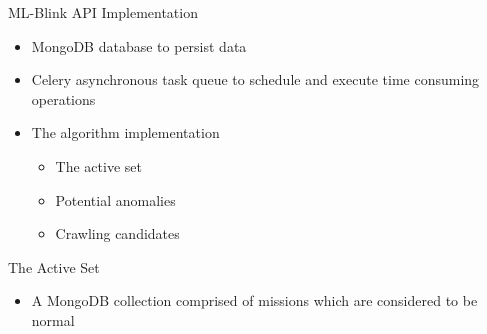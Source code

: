 \begin{frame}{ML-Blink API Implementation}
    \begin{itemize}
        \item MongoDB database to persist data
        \item Celery asynchronous task queue to schedule and execute time consuming operations
        \item The \mlblink algorithm implementation
        \begin{itemize}
            \item The active set
            \item Potential anomalies
            \item Crawling candidates
        \end{itemize}
    \end{itemize}
\end{frame}

\begin{frame}{The Active Set}
    \begin{itemize}
        \item A MongoDB collection comprised of missions which are considered to be normal
    \end{itemize}
\end{frame}



